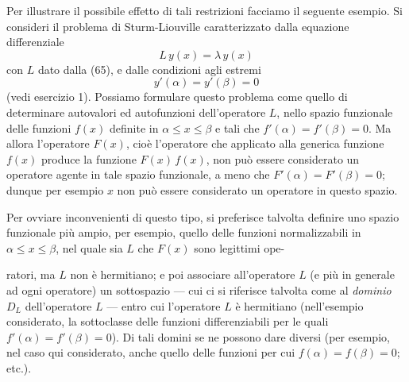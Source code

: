 \documentclass[11pt, a4paper]{book}
\numberwithin{equation}{section}
\begin{document}
Per illustrare il possibile effetto di tali restrizioni facciamo il
seguente esempio. Si consideri il problema di Sturm-Liouville caratterizzato dalla equazione differenziale
\[
L\, y(x) = \lambda\, y(x)
\]
con $L$ dato dalla (65), e dalle condizioni agli estremi
\[
y'(\alpha) = y'(\beta) = 0
\]
(vedi esercizio 1). Possiamo formulare questo problema come quello di
determinare autovalori ed autofunzioni dell'operatore $L$, nello spazio funzionale delle funzioni $f(x)$ definite in $\alpha \leq x \leq \beta$ e tali che
$f'(\alpha) = f'(\beta) = 0$. Ma allora l'operatore $F(x)$, cioè l'operatore che
applicato alla generica funzione $f(x)$ produce la funzione $F(x)\,f(x)$, non può
essere considerato un operatore agente in tale spazio funzionale, a meno
che $F'(\alpha) = F'(\beta) = 0$; dunque per esempio $x$ non può essere considerato un
operatore in questo spazio.

Per ovviare inconvenienti di questo tipo, si preferisce talvolta definire uno spazio funzionale più ampio, per esempio, quello delle funzioni
normalizzabili in $\alpha \leq x \leq \beta$, nel quale sia $L$ che $F(x)$ sono legittimi ope-


ratori, ma $L$ non è hermitiano; e poi associare all'operatore $L$ (e
più in generale ad ogni operatore) un sottospazio --- cui ci si riferisce
talvolta come al \emph{dominio} $D_L$ dell'operatore $L$ --- entro cui l'operatore $L$ è hermitiano (nell'esempio considerato, la sottoclasse delle
funzioni differenziabili per le quali $f'(\alpha) = f'(\beta) = 0$). Di tali domini
se ne possono dare diversi (per esempio, nel caso qui considerato, anche
quello delle funzioni per cui $f(\alpha) = f(\beta) = 0$; etc.).
\end{document}
